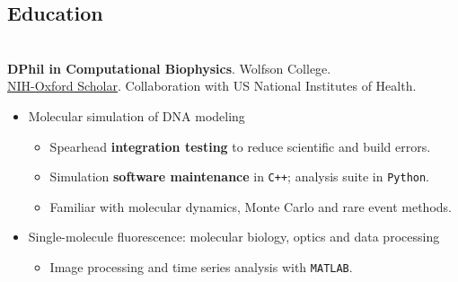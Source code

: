 \documentclass[margin, a4paper]{res}
\begin{document}
 
\begin{sloppypar}
 


\begin{resume} 
\setlength{\parskip}{1.00ex}
\setlength{\parindent}{0pt}
 
\section{Education} 
\\
\textbf{DPhil in Computational Biophysics}. Wolfson College. \\
\href{http://oxcam.gpp.nih.gov/}{NIH-Oxford Scholar}. Collaboration with US National Institutes of Health.

\begin{itemize}
\item Molecular simulation of DNA modeling
    \begin{itemize}
        \item Spearhead \textbf{integration testing} to reduce scientific and build errors.
        \item Simulation \textbf{software maintenance} in \texttt{C++}; analysis suite in \texttt{Python}.
        \item Familiar with molecular dynamics, Monte Carlo and rare event methods.
    \end{itemize}
\item Single-molecule fluorescence: molecular biology, optics and data processing
    \begin{itemize}
    \item Image processing and time series analysis with \textsc{\texttt{MATLAB}}. 
    \end{itemize}
\end{itemize}


\end{resume}
\end{sloppypar}
\end{document}
